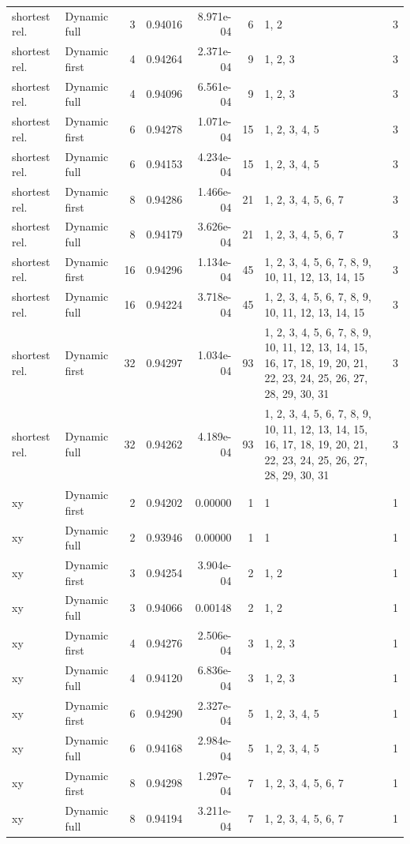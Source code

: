\documentclass[10pt,a4paper]{article}
\begin{document}
\begin{longtable}{@{}p{23mm}p{29mm}rrrrp{36mm}r@{}}
shortest rel. & Dynamic full & 3 & 0.94016 & 8.971e-04 & 6 & 1, 2 & 3 \\
shortest rel. & Dynamic first & 4 & 0.94264 & 2.371e-04 & 9 & 1, 2, 3 & 3 \\
shortest rel. & Dynamic full & 4 & 0.94096 & 6.561e-04 & 9 & 1, 2, 3 & 3 \\
shortest rel. & Dynamic first & 6 & 0.94278 & 1.071e-04 & 15 & 1, 2, 3, 4, 5 & 3 \\
shortest rel. & Dynamic full & 6 & 0.94153 & 4.234e-04 & 15 & 1, 2, 3, 4, 5 & 3 \\
shortest rel. & Dynamic first & 8 & 0.94286 & 1.466e-04 & 21 & 1, 2, 3, 4, 5, 6, 7 & 3 \\
shortest rel. & Dynamic full & 8 & 0.94179 & 3.626e-04 & 21 & 1, 2, 3, 4, 5, 6, 7 & 3 \\
shortest rel. & Dynamic first & 16 & 0.94296 & 1.134e-04 & 45 & 1, 2, 3, 4, 5, 6, 7, 8, 9, 10, 11, 12, 13, 14, 15 & 3 \\
shortest rel. & Dynamic full & 16 & 0.94224 & 3.718e-04 & 45 & 1, 2, 3, 4, 5, 6, 7, 8, 9, 10, 11, 12, 13, 14, 15 & 3 \\
shortest rel. & Dynamic first & 32 & 0.94297 & 1.034e-04 & 93 & 1, 2, 3, 4, 5, 6, 7, 8, 9, 10, 11, 12, 13, 14, 15, 16, 17, 18, 19, 20, 21, 22, 23, 24, 25, 26, 27, 28, 29, 30, 31 & 3 \\
shortest rel. & Dynamic full & 32 & 0.94262 & 4.189e-04 & 93 & 1, 2, 3, 4, 5, 6, 7, 8, 9, 10, 11, 12, 13, 14, 15, 16, 17, 18, 19, 20, 21, 22, 23, 24, 25, 26, 27, 28, 29, 30, 31 & 3 \\
xy & Dynamic first & 2 & 0.94202 & 0.00000 & 1 & 1 & 1 \\
xy & Dynamic full & 2 & 0.93946 & 0.00000 & 1 & 1 & 1 \\
xy & Dynamic first & 3 & 0.94254 & 3.904e-04 & 2 & 1, 2 & 1 \\
xy & Dynamic full & 3 & 0.94066 & 0.00148 & 2 & 1, 2 & 1 \\
xy & Dynamic first & 4 & 0.94276 & 2.506e-04 & 3 & 1, 2, 3 & 1 \\
xy & Dynamic full & 4 & 0.94120 & 6.836e-04 & 3 & 1, 2, 3 & 1 \\
xy & Dynamic first & 6 & 0.94290 & 2.327e-04 & 5 & 1, 2, 3, 4, 5 & 1 \\
xy & Dynamic full & 6 & 0.94168 & 2.984e-04 & 5 & 1, 2, 3, 4, 5 & 1 \\
xy & Dynamic first & 8 & 0.94298 & 1.297e-04 & 7 & 1, 2, 3, 4, 5, 6, 7 & 1 \\
xy & Dynamic full & 8 & 0.94194 & 3.211e-04 & 7 & 1, 2, 3, 4, 5, 6, 7 & 1 \\

\end{longtable}
\end{document}
